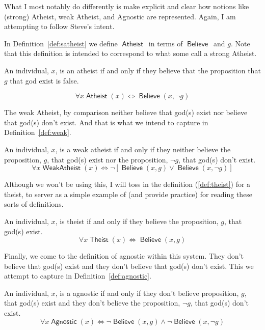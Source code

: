 \documentclass[12pt]{article}
\providecommand{\land}{\wedge}
\providecommand{\lor}{\vee}
\providecommand{\liff}{\iff}
\providecommand{\lnot}{\neg}
\providecommand{\lall}{\forall}
\newcommand{\rel}[1]{\ensuremath{\mathop{\mathsf{#1}}}}
\newcommand{\rlbelieve}{\rel{Believe}}
\newcommand{\rlatheist}{\rel{Atheist}}
\newcommand{\rlwa}{\rel{WeakAtheist}}
\newcommand{\rlagno}{\rel{Agnostic}}
\begin{document}
What I most notably do differently is make explicit and clear how notions like (strong) Atheist, weak Atheist, and Agnostic are represented. Again, I am attempting to follow Steve's intent.

In Definition~\ref{def:satheist} we define  \rlatheist\ in terms of \rlbelieve\ and $g$. Note that this definition is intended to correspond to what some call a strong Atheist.

\begin{definition}[Atheist]\label{def:satheist}
    An individual, $x$, is an atheist if and only if they believe that the proposition that $g$ that god exist is false.

    \[
        \lall x \rlatheist(x) \liff \rlbelieve(x, \lnot g)
    \]
\end{definition}

The weak Atheist, by comparison neither believe that god(s) exist nor believe that god(s) don't exist. And that is what we intend to capture in Definition~\ref{def:weak}.

\begin{definition}\label{def:weak}
    An individual, $x$, is a weak atheist if and only if they neither believe the proposition, $g$, that god(s) exist nor the proposition, $\lnot g$, that god(s) don't exist.
    \[
        \lall x \rlwa(x) \liff
          \lnot\left[\rlbelieve(x, g) \lor \rlbelieve(x, \lnot g)\right]
    \]
\end{definition}

Although we won't be using this, I will toss in the definition (\ref{def:theist}) for a theist, to server as a simple example of (and provide practice) for reading these sorts of definitions.

\begin{definition}[Theist]\label{def:theist}
    An individual, $x$, is theist if and only if they believe the proposition, $g$, that god(s) exist.
    \[
        \lall x \rel{Theist}(x) \liff \rlbelieve(x, g)
    \]
\end{definition}

Finally, we come to the definition of agnostic within this system. They don't believe that god(s) exist and they don't believe that god(s) don't exist.
This we attempt to capture in Definition~\ref{def:agnostic}.

\begin{definition}[Agnostic]\label{def:agnostic}
    An individual, $x$, is a agnostic if and only if they don't believe proposition, $g$, that god(s) exist and they don't believe the proposition, $\lnot g$, that god(s) don't exist.
    \[
        \lall x \rlagno(x) \liff
          \lnot \rlbelieve(x, g) \land \lnot\rlbelieve(x, \lnot g)
    \]
\end{definition}
\end{document}
